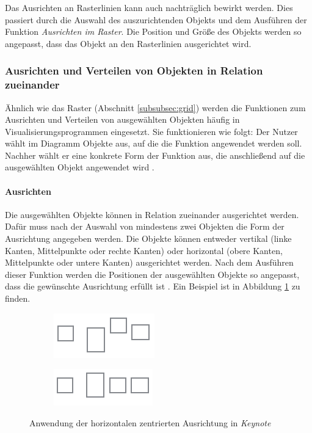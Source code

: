 Das Ausrichten an Rasterlinien kann auch nachträglich bewirkt werden. Dies passiert durch die Auswahl des auszurichtenden Objekts und dem Ausführen der Funktion \textit{Ausrichten im Raster}. Die Position und Größe des Objekts werden so angepasst, dass das Objekt an den Rasterlinien ausgerichtet wird.

\subsubsection{Ausrichten und Verteilen von Objekten in Relation zueinander}
\label{subsubsec:alignment-and-distribution}

Ähnlich wie das Raster (Abschnitt \ref{subsubsec:grid}) werden die Funktionen zum Ausrichten und Verteilen von ausgewählten Objekten häufig in Visualisierungsprogrammen eingesetzt. Sie funktionieren wie folgt: Der Nutzer wählt im Diagramm Objekte aus, auf die die Funktion angewendet werden soll. Nachher wählt er eine konkrete Form der Funktion aus, die anschließend auf die ausgewählten Objekt angewendet wird \cite{11Keynote}.

\paragraph{Ausrichten}

Die ausgewählten Objekte können in Relation zueinander ausgerichtet werden. Dafür muss nach der Auswahl von mindestens zwei Objekten die Form der Ausrichtung angegeben werden. Die Objekte können entweder vertikal (linke Kanten, Mittelpunkte oder rechte Kanten) oder horizontal (obere Kanten, Mittelpunkte oder untere Kanten) ausgerichtet werden. Nach dem Ausführen dieser Funktion werden die Positionen der ausgewählten Objekte so angepasst, dass die gewünschte Ausrichtung erfüllt ist \cite{11Keynote, 08OmniGraffle}. Ein Beispiel ist in Abbildung \ref{fig:keynote-horizontal-alignment} zu finden.

\begin{figure}[hbt]
    \newcommand{\subfigurewidth}{0.5\textwidth}
    \begin{subfigure}{\subfigurewidth}
        \centering
        \includegraphics{resources/keynote-horizontal-alignment-a}
        \caption{}
    \end{subfigure}
    \begin{subfigure}{\subfigurewidth}
        \centering
        \includegraphics{resources/keynote-horizontal-alignment-b}
        \caption{}
    \end{subfigure}
    \caption{Anwendung der horizontalen zentrierten Ausrichtung in \textit{Keynote}}
    \label{fig:keynote-horizontal-alignment}
\end{figure}

